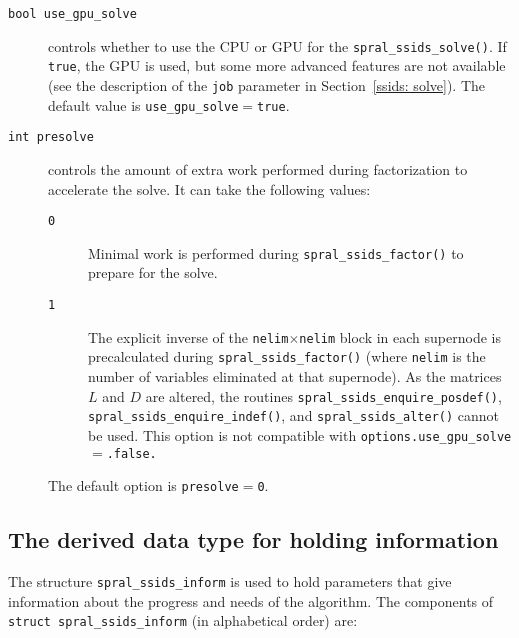 
\begin{description}
\item[\texttt{bool use\_gpu\_solve}] controls
   whether to use the CPU or GPU for the \texttt{spral\_ssids\_solve()}. If
   \texttt{true}, the GPU is used, but some more advanced features are not
   available (see the description of the \texttt{job} parameter in
   Section~\ref{ssids: solve}).
   The default value is \texttt{use\_gpu\_solve}$=$\texttt{true}.
\item[\texttt{int presolve}] controls the
   amount of extra work performed during factorization to accelerate the solve.
   It can take the following values:
   \begin{description}
      \item[\texttt{0}] Minimal work is performed during {\tt spral\_ssids\_factor()}
         to prepare for the solve.
      \item[\texttt{1}] The explicit inverse of the
         \texttt{nelim}$\times$\texttt{nelim} block in each supernode is
         precalculated during {\tt spral\_ssids\_factor()} (where \texttt{nelim} is
         the number of variables eliminated at that supernode). As the matrices
         $L$ and $D$ are altered, the routines {\tt spral\_ssids\_enquire\_posdef()},
         {\tt spral\_ssids\_enquire\_indef()}, and {\tt spral\_ssids\_alter()} cannot be used.
         This option is not compatible with {\tt options.use\_gpu\_solve}$=$\texttt{.false.}
   \end{description}
   The default option is \texttt{presolve}$=$\texttt{0}.
\end{description}


\subsection{The derived data type for holding information}
\label{ssids: typeinform}
The structure {\tt spral\_ssids\_inform}
is used to hold parameters that give information about the progress and needs
of the algorithm. The components of {\tt struct spral\_ssids\_inform}
(in alphabetical order) are:

